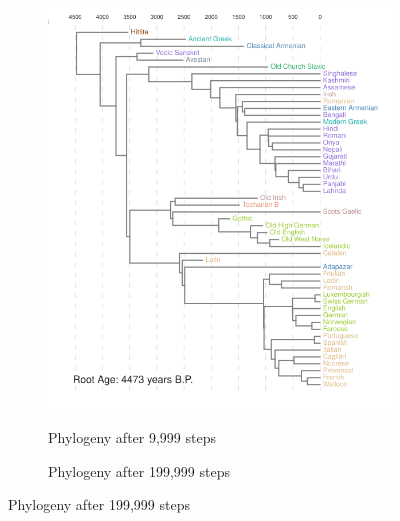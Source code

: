 \documentclass[10pt,journal,compsoc]{IEEEtran}
\begin{document}


\begin{figure}
     \centering
     \begin{subfigure}[b]{0.4\paperwidth}
         \centering
         \caption{Phylogeny after 9,999 steps}
         \includegraphics[width=\textwidth]{runs26-conv1}
         \label{fig:y equals x}
     \end{subfigure}
     \hfill
     \begin{subfigure}[b]{0.4\paperwidth}
         \centering
         \caption{Phylogeny after 199,999 steps}

\end{subfigure}
\end{figure}
\end{document}
